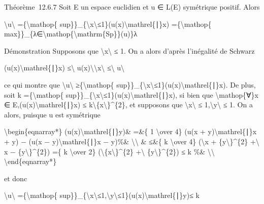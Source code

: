 \documentclass[]{article}
\begin{document}
Théorème~12.6.7 Soit E un espace euclidien et u ∈ L(E) symétrique
positif. Alors

\textbackslash{}\textbar{}u\textbackslash{}\textbar{}
=\{\textbackslash{}mathop\{
sup\}\}\_\{\textbackslash{}\textbar{}x\textbackslash{}\textbar{}≤1\}(u(x)\textbackslash{}mathrel\{∣\}x)
=\{\textbackslash{}mathop\{
max\}\}\_\{λ∈\textbackslash{}mathop\{\textbackslash{}mathrm\{Sp\}\}(u)\}λ

Démonstration Supposons que
\textbackslash{}\textbar{}x\textbackslash{}\textbar{} ≤ 1. On a alors
d'après l'inégalité de Schwarz

(u(x)\textbackslash{}mathrel\{∣\}x) ≤\textbackslash{}\textbar{}
u(x)\textbackslash{}\textbar{}\textbackslash{}\textbar{}x\textbackslash{}\textbar{}
≤\textbackslash{}\textbar{} u\textbackslash{}\textbar{}

ce qui montre que \textbackslash{}\textbar{}u\textbackslash{}\textbar{}
≥\{\textbackslash{}mathop\{
sup\}\}\_\{\textbackslash{}\textbar{}x\textbackslash{}\textbar{}≤1\}(u(x)\textbackslash{}mathrel\{∣\}x).
De plus, soit k =\{\textbackslash{}mathop\{
sup\}\}\_\{\textbackslash{}\textbar{}x\textbackslash{}\textbar{}≤1\}(u(x)\textbackslash{}mathrel\{∣\}x),
si bien que \textbackslash{}mathop\{∀\}x ∈
E,(u(x)\textbackslash{}mathrel\{∣\}x) ≤
k\textbackslash{}\textbar{}\{x\textbackslash{}\textbar{}\}\^{}\{2\}, et
supposons que \textbackslash{}\textbar{}x\textbackslash{}\textbar{} ≤
1,\textbackslash{}\textbar{}y\textbackslash{}\textbar{} ≤ 1. On a alors,
puisque u est symétrique

\textbackslash{}begin\{eqnarray*\}
\textbar{}(u(x)\textbackslash{}mathrel\{∣\}y)\textbar{}\& =\&\{ 1
\textbackslash{}over 4\} \textbar{}(u(x +
y)\textbackslash{}mathrel\{∣\}x + y) − (u(x −
y)\textbackslash{}mathrel\{∣\}x − y)\textbar{}\%\&
\textbackslash{}\textbackslash{} \& ≤\&\{ k \textbackslash{}over 4\}
(\textbackslash{}\textbar{}x + \{y\textbackslash{}\textbar{}\}\^{}\{2\}
+\textbackslash{}\textbar{} x −
\{y\textbackslash{}\textbar{}\}\^{}\{2\}) =\{ k \textbackslash{}over 2\}
(\textbackslash{}\textbar{}\{x\textbackslash{}\textbar{}\}\^{}\{2\}
+\textbackslash{}\textbar{} \{y\textbackslash{}\textbar{}\}\^{}\{2\}) ≤
k \%\& \textbackslash{}\textbackslash{} \textbackslash{}end\{eqnarray*\}

et donc

\textbackslash{}\textbar{}u\textbackslash{}\textbar{}
=\{\textbackslash{}mathop\{
sup\}\}\_\{\textbackslash{}\textbar{}x\textbackslash{}\textbar{}≤1,\textbackslash{}\textbar{}y\textbackslash{}\textbar{}≤1\}\textbar{}(u(x)\textbackslash{}mathrel\{∣\}y)\textbar{}≤
k
\end{document}
